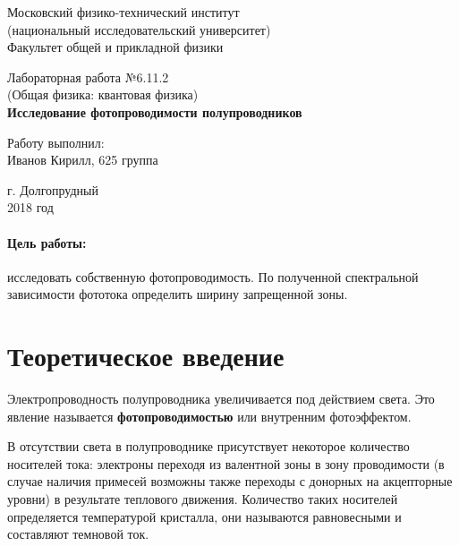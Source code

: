 \documentclass[12pt]{kiarticle} %
\begin{document}
	
	\begin{titlepage}
		\begin{center}
			\large 	Московский физико-технический институт \\
				(национальный исследовательский университет) \\
			Факультет общей и прикладной физики \\
			\vspace{0.2cm}
			
			\vspace{4.5cm}
			Лабораторная работа №6.11.2 \\ \vspace{0.2cm}
			\large (Общая физика: квантовая физика) \\ \vspace{0.2cm}
			\LARGE \textbf{Исследование фотопроводимости полупроводников}
		\end{center}
		\vspace{2.3cm} \large
		
		\begin{center}
			Работу выполнил: \\
			Иванов Кирилл,
			625 группа
			\vspace{10mm}		
			
		\end{center}
		
		\begin{center} \vspace{60mm}
			г. Долгопрудный \\
			2018 год
		\end{center}
	\end{titlepage}


	\paragraph*{Цель работы:} исследовать собственную фотопроводимость. По полученной спектральной зависимости фототока определить ширину запрещенной зоны.
	
	
	
	\section{Теоретическое введение}
	
	Электропроводность полупроводника увеличивается под действием света. Это явление называется \textbf{фотопроводимостью} или {внутренним фотоэффектом}. 
	
	В отсутствии света в полупроводнике присутствует некоторое количество носителей тока: электроны переходя из валентной зоны в зону проводимости (в случае наличия примесей возможны также переходы с донорных на акцепторные уровни) в результате теплового движения. Количество таких носителей определяется температурой кристалла, они называются равновесными и составляют темновой ток. 
	
\end{document}
